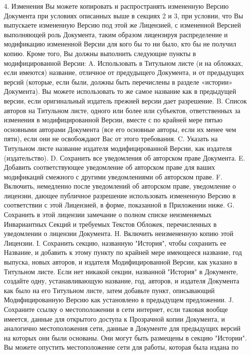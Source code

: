 4. Изменения
Вы можете копировать и распространять измененную Версию Документа при условиях описанных выше в секциях 2 и 3, при условии,
 что Вы выпускаете измененную Версию под этой же Лицензией, с измененной Версией выполняющей роль Документа, таким образом
 лицензируя распределение и модификацию измененной Версии для кого бы то ни было, кто бы не получил копию. Кроме того,
 Вы должны выполнить следующие пункты в модифицированной Версии:
A. Использовать в Титульном листе (и на обложках, если имеются) название, отличное от предудыщего Документа, и от предыдущих
 версий (которые, если были, должны быть перечислены в разделе «истории» Документа). Вы можете использовать то же самое
 название как в предыдущей версии, если оригинальный издатель прежней версии дает разрешение.
B. Список авторов на Титульном листе, одного или более или субъектов, ответственных за изменения в модифицированной Версии,
 вместе с по крайней мере пятью основными авторами Документа (все его основные авторы, если их менее чем пяти), если они не
 освобождают Вас от этого требования.
C. Указать на Титульном листе название издателя модифицированной Версии, как издателя (издательство).
D. Сохранить все уведомления об авторском праве Документа.
E. Добавить соответствующее уведомление об авторском праве для ваших модификаций смежного с другими уведомлениями об
 авторском праве.
F. Включить, немедленно после уведомлений об авторском праве, уведомление о лицензии, дающее публичное разрешение
 использовать измененную Версию в соответствии с этой Лицензией, в форме, показанной в Приложении ниже.
G. Сохранить в этой лицензии замечание о полном списке неизменяемых Инвариантных Секций и требуемых Текстов Обложек,
 перечисленных в уведомлении о лицензии Документа.
H. Включить неизмененную копию этой Лицензии.
I. Сохранить секцию, названную "История", чтобы сохранить ее Название, и добавить к этому пункту по крайней мере имеющееся
 название, год выпуска, новых авторов, и издателя Модифицированной  Версии, как указано в Титульном листе. Если нет
 никакой секции, названной "История" в Документе, создайте одну, устанавливающую название, год, авторов, и издателя Документа
 как было на его Титульном листе, затем добавьте пункт, описывающий Модифицированную Версию как установлено в предыдущем
 предложении.
J. Сохраните ссылку о местоположении в сети интернет, если таковая вообще имеется, данные для открытого доступа к Прозрачной
 копии Документа, и аналогично местоположения сети, данные в Документе для предыдущих версий на которых они были основаны.
 Они могут быть размещены в секцию "Истории". Вы можете опустить местоположение сети для работы, которая была издана по
